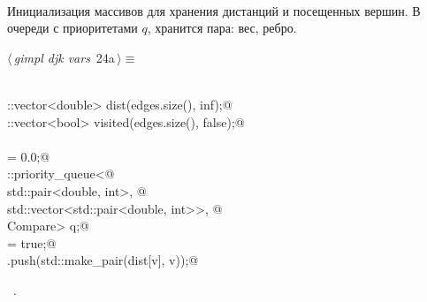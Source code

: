 \documentclass[12pt]{article}
\begin{document}
\paragraph{}
Инициализация массивов для хранения дистанций и посещенных вершин.
В очереди с приоритетами $q$, хранится пара: вес, ребро.
\begin{flushleft} \small
\begin{minipage}{\linewidth}\label{scrap38}\raggedright\small
{} $\langle\,${\itshape gimpl djk vars}\nobreak\ {\footnotesize {24a}}$\,\rangle\equiv$
\vspace{-1ex}
\begin{list}{}{} \item
\mbox{}\verb@@\\
\mbox{}\verb@std::vector<double> dist(edges.size(), inf);@\\
\mbox{}\verb@std::vector<bool> visited(edges.size(), false);@\\
\mbox{}\verb@@\\
\mbox{}\verb@dist[v] = 0.0;@\\
\mbox{}\verb@std::priority_queue<@\\
\mbox{}\verb@  std::pair<double, int>, @\\
\mbox{}\verb@  std::vector<std::pair<double, int>>, @\\
\mbox{}\verb@  Compare> q;@\\
\mbox{}\verb@visited[v] = true;@\\
\mbox{}\verb@q.push(std::make_pair(dist[v], v));@\\
\mbox{}\verb@@{\NWsep}
\end{list}
\vspace{-1.5ex}
\footnotesize
\begin{list}{}{\setlength{\itemsep}{-\parsep}\setlength{\itemindent}{-\leftmargin}}
\item \NWtxtMacroRefIn\ .

\item{}
\end{list}
\end{minipage}\vspace{4ex}
\end{flushleft}
\end{document}

